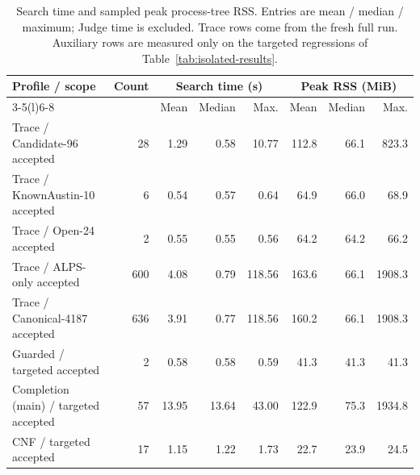 \begin{table}[t]
\caption{Search time and sampled peak process-tree RSS.  Entries are
mean / median / maximum; Judge time is excluded.  Trace rows come from the
fresh full run.  Auxiliary rows are measured only on the targeted regressions
of Table~\ref{tab:isolated-results}.}
\label{tab:feasibility}
\centering
\scriptsize
\setlength{\tabcolsep}{3pt}
\renewcommand{\arraystretch}{1.08}
\begin{tabular}{@{}lrrrrrrr@{}}
\toprule
Profile / scope & Count & \multicolumn{3}{c}{Search time (s)} &
\multicolumn{3}{c}{Peak RSS (MiB)} \\
\cmidrule(lr){3-5}\cmidrule(l){6-8}
& & Mean & Median & Max. & Mean & Median & Max. \\
\midrule
Trace / Candidate-96 accepted & 28 & 1.29 & 0.58 & 10.77 & 112.8 & 66.1 & 823.3 \\
Trace / KnownAustin-10 accepted & 6 & 0.54 & 0.57 & 0.64 & 64.9 & 66.0 & 68.9 \\
Trace / Open-24 accepted & 2 & 0.55 & 0.55 & 0.56 & 64.2 & 64.2 & 66.2 \\
Trace / ALPS-only accepted & 600 & 4.08 & 0.79 & 118.56 & 163.6 & 66.1 & 1908.3 \\
Trace / Canonical-4187 accepted & 636 & 3.91 & 0.77 & 118.56 & 160.2 & 66.1 & 1908.3 \\
Guarded / targeted accepted & 2 & 0.58 & 0.58 & 0.59 & 41.3 & 41.3 & 41.3 \\
Completion (main) / targeted accepted & 57 & 13.95 & 13.64 & 43.00 & 122.9 & 75.3 & 1934.8 \\
CNF / targeted accepted & 17 & 1.15 & 1.22 & 1.73 & 22.7 & 23.9 & 24.5 \\
\bottomrule
\end{tabular}
\end{table}

